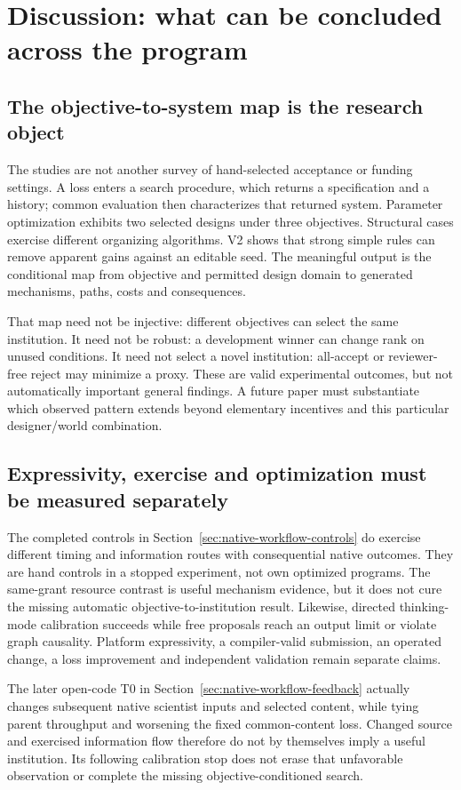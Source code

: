 \section{Discussion: what can be concluded across the program}
\subsection{The objective-to-system map is the research object}
The studies are not another survey of hand-selected acceptance or funding
settings. A loss enters a search procedure, which returns a specification and
a history; common evaluation then characterizes that returned system.
Parameter optimization exhibits two selected designs under three objectives.
Structural cases exercise different organizing algorithms. V2 shows that
strong simple rules can remove apparent gains against an editable seed.
The meaningful output is the conditional map from objective and permitted
design domain to generated mechanisms, paths, costs and consequences.

That map need not be injective: different objectives can select the same
institution. It need not be robust: a development winner can change rank on
unused conditions. It need not select a novel institution: all-accept or
reviewer-free reject may minimize a proxy. These are valid experimental
outcomes, but not automatically important general findings. A future paper
must substantiate which observed pattern extends beyond elementary incentives
and this particular designer/world combination.

\subsection{Expressivity, exercise and optimization must be measured separately}
The completed controls in Section~\ref{sec:native-workflow-controls} do exercise
different timing and information routes with consequential native outcomes.
They are hand controls in a stopped experiment, not own optimized programs.
The same-grant resource contrast is useful mechanism evidence, but it does
not cure the missing automatic objective-to-institution result. Likewise,
directed thinking-mode calibration succeeds while free proposals reach an
output limit or violate graph causality. Platform expressivity, a compiler-valid
submission, an operated change, a loss improvement and independent validation
remain separate claims.

The later open-code T0 in Section~\ref{sec:native-workflow-feedback} actually
changes subsequent native scientist inputs and selected content, while tying
parent throughput and worsening the fixed common-content loss. Changed source
and exercised information flow therefore do not by themselves imply a useful
institution. Its following calibration stop does not erase that unfavorable
observation or complete the missing objective-conditioned search.

